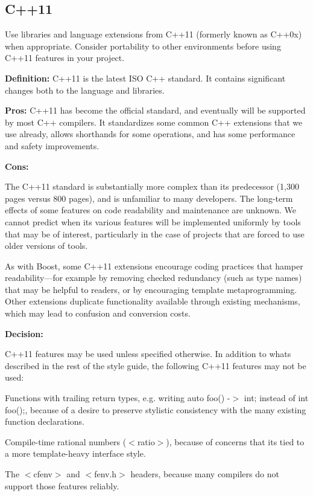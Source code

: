 \subsection*{C++11}

Use libraries and language extensions from C++11 (formerly known as C++0x) when appropriate. Consider portability to other environments before using C++11 features in your project.

{\bfseries Definition\+:} C++11 is the latest I\+SO C++ standard. It contains significant changes both to the language and libraries.

{\bfseries Pros\+:} C++11 has become the official standard, and eventually will be supported by most C++ compilers. It standardizes some common C++ extensions that we use already, allows shorthands for some operations, and has some performance and safety improvements.

{\bfseries Cons\+:}

The C++11 standard is substantially more complex than its predecessor (1,300 pages versus 800 pages), and is unfamiliar to many developers. The long-\/term effects of some features on code readability and maintenance are unknown. We cannot predict when its various features will be implemented uniformly by tools that may be of interest, particularly in the case of projects that are forced to use older versions of tools.

As with Boost, some C++11 extensions encourage coding practices that hamper readability—for example by removing checked redundancy (such as type names) that may be helpful to readers, or by encouraging template metaprogramming. Other extensions duplicate functionality available through existing mechanisms, which may lead to confusion and conversion costs.

{\bfseries Decision\+:}

C++11 features may be used unless specified otherwise. In addition to what\textquotesingle{}s described in the rest of the style guide, the following C++11 features may not be used\+:


\begin{DoxyItemize}
\item Functions with trailing return types, e.\+g. writing {\ttfamily auto foo() -\/$>$ int;} instead of {\ttfamily int foo();}, because of a desire to preserve stylistic consistency with the many existing function declarations.
\item Compile-\/time rational numbers ({\ttfamily $<$ratio$>$}), because of concerns that it\textquotesingle{}s tied to a more template-\/heavy interface style.
\item The {\ttfamily $<$cfenv$>$} and {\ttfamily $<$fenv.\+h$>$} headers, because many compilers do not support those features reliably.
\end{DoxyItemize}

